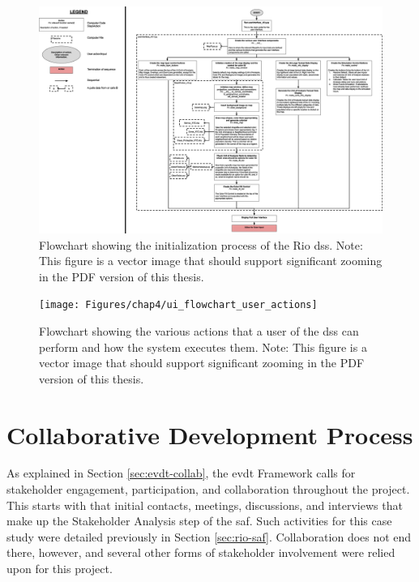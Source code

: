 \begin{landscape}

\begin{figure}[t] 
\centering
\includegraphics[scale=0.2]{Figures/chap4/ui_flowchart_initialization}
\caption[Flowchart of Rio DSS Initialization]{Flowchart showing the initialization process of the Rio \ac{dss}. Note: This figure is a vector image that should support significant zooming in the PDF version of this thesis.}
\label{fig:ui_flowchart_initialization}
\end{figure}

\begin{figure}[t] 
\centering
\texttt{[image: Figures/chap4/ui\_flowchart\_user\_actions]}
\caption[Flowchart of Rio DSS Actions]{Flowchart showing the various actions that a user of the \ac{dss} can perform and how the system executes them. Note: This figure is a vector image that should support significant zooming in the PDF version of this thesis.}
\label{fig:ui_flowchart_user_actions}
\end{figure}
\end{landscape}

\section{Collaborative Development Process} \label{sec:rio-collab}

As explained in Section \ref{sec:evdt-collab}, the \ac{evdt} Framework calls for stakeholder engagement, participation, and collaboration throughout the project. This starts with that initial contacts, meetings, discussions, and interviews that make up the Stakeholder Analysis step of the \ac{saf}. Such activities for this case study were detailed previously in Section \ref{sec:rio-saf}. Collaboration does not end there, however, and several other forms of stakeholder involvement were relied upon for this project.


